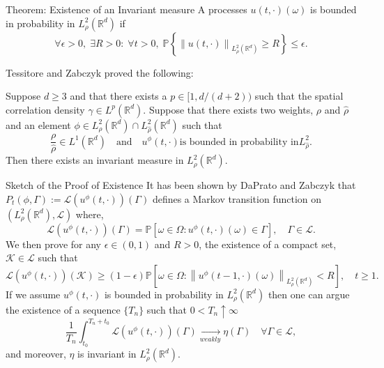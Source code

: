 \documentclass{beamer}%
\numberwithin{equation}{section}
\newcommand{\R}{\mathbb{R}}
\newcommand{\Norm}[1]{\left\|  #1   \right\|}
\begin{document}
\begin{frame}{Theorem: Existence of an Invariant measure}
	A processes $u(t,\cdot)(\omega)$ is bounded in probability in $L^2_{\rho}(\R^d)$ if
	\[
	\forall \epsilon >0, \; \exists R>0: \; \forall t>0, \; \mathbb{P}\left\{ \Norm{u(t,\cdot)}_{L^2_{\rho}(\R^d)} \ge R \right\} \le \epsilon.
	\] 	
	
	Tessitore and Zabczyk proved the following: \vspace{.1in}
	\begin{theorem}
		Suppose $d \ge 3$ and that there exists a $p \in [1,d/(d+2))$ such that the spatial correlation density $\gamma \in L^p(\R^d)$. Suppose that there exists two weights, $\rho$ and $\hat{\rho}$ and an element $\phi \in L^2_{\rho}(\R^d) \cap L^2_{\hat{\rho}}(\R^d)$ such that 
		\[
		\frac{\rho}{\hat{\rho}} \in L^1(\R^d) \quad \text{and} \quad u^\phi(t,\cdot) \text{is bounded in probability in} L^2_{\hat{\rho}} .
		\]
		Then there exists an invariant measure in $L^2_{\rho}(\R^d)$. 
	\end{theorem}
\end{frame}

\begin{frame}{Sketch of the Proof of Existence}
	It has been shown by DaPrato and Zabczyk that $P_t(\phi,\Gamma) := \mathscr{L}(u^\phi(t,\cdot))(\Gamma)$ defines a Markov transition function on $(L^2_{\rho}(\R^d), \mathscr{L})$ where,	
		\[
		\mathscr{L}(u^\phi(t,\cdot))(\Gamma) = \mathbb{P}\left[\omega \in \Omega : u^\phi(t,\cdot)(\omega) \in \Gamma \right], \quad \Gamma \in \mathscr{L}.
		\]
	We then prove for any $\epsilon \in (0,1)$ and $R>0$, the existence of a compact set, $\mathcal{K} \in \mathscr{L}$ such that 
		\[
				\mathscr{L}(u^\phi(t,\cdot))(\mathcal{K}) \ge (1-\epsilon)\mathbb{P}\left[\omega \in \Omega : \Norm{u^\phi(t-1,\cdot)(\omega)}_{L^2_{\rho}(\R^d)} < R \right], \quad t \ge 1.
		\]
	If we assume $u^\phi(t,\cdot)$ is bounded in probability in $L^2_{\rho}(\R^d)$ then one can argue the existence of a sequence $\{T_n\}$ such that $0<T_n \uparrow \infty$ 
		\[
				\frac{1}{T_n} \int _{t_0}^{T_n + t_0} 	\mathscr{L}(u^\phi(t,\cdot))(\Gamma) \xrightarrow[weakly]{} \eta(\Gamma) \quad \forall \Gamma \in \mathscr{L},
		\] 
	and moreover, $\eta$ is invariant in $L^2_{\rho}(\R^d)$.
		
\end{frame}
\end{document}
